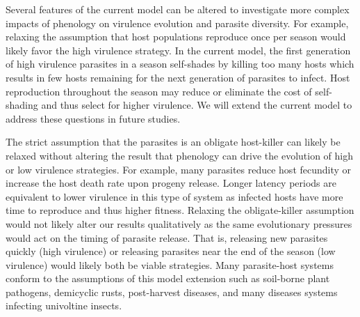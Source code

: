 \documentclass{article}
\begin{document}
Several features of the current model can be altered to investigate more complex impacts of phenology on virulence evolution and parasite diversity. For example, relaxing the assumption that host populations reproduce once per season would likely favor the high virulence strategy. In the current model, the first generation of high virulence parasites in a season self-shades by killing too many hosts which results in few hosts remaining for the next generation of parasites to infect. Host reproduction throughout the season may reduce or eliminate the cost of self-shading and thus select for higher virulence. %
We will extend the current model to address these questions in future studies.

The strict assumption that the parasites is an obligate host-killer can likely be relaxed without altering the result that phenology can drive the evolution of high or low virulence strategies. For example, many parasites reduce host fecundity or increase the host death rate upon progeny release. Longer latency periods are equivalent to lower virulence in this type of system as infected hosts have more time to reproduce and thus higher fitness. Relaxing the obligate-killer assumption would not likely alter our results qualitatively as the same evolutionary pressures would act on the timing of parasite release. That is, releasing new parasites quickly (high virulence) or releasing parasites near the end of the season (low virulence) would likely both be viable strategies. Many parasite-host systems conform to the assumptions of this model extension such as soil-borne plant pathogens, demicyclic rusts, post-harvest diseases, and many diseases systems infecting univoltine insects\cite{gaulin2007root,zehr1982control,crowell1934hosts,holuvsa2017pathogen}.




\end{document}
